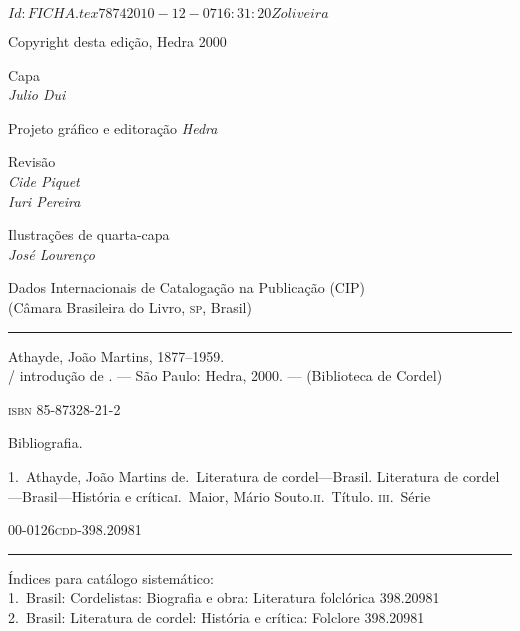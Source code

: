 \SVN $Id: FICHA.tex 7874 2010-12-07 16:31:20Z oliveira $

\pagebreak

\begingroup \fontsize{9pt}{0.7\baselineskip}\selectfont \parskip=0pt\thispagestyle{empty} 

\begin{center}
Copyright\raisebox{-1.2mm}{$^\copyright$}  desta edição, Hedra 2000\\\medskip

Capa\\
\textit{Julio Dui}\\\medskip

Projeto gráfico e editoração
\textit{Hedra}

Revisão\\
\textit{Cide Piquet}\\
\textit{Iuri Pereira}\\\medskip

Ilustrações de quarta-capa\\
\textit{José Lourenço}\\\bigskip

\begin{minipage}{.8\textwidth}
\fontsize{7pt}{5pt}\selectfont
Dados Internacionais de Catalogação na Publicação (CIP)\\
(Câmara Brasileira do Livro, \textsc{sp}, Brasil)\\
\mbox{}\vspace{-0.2ex}\hrule\vspace{1ex}

Athayde, João Martins, 1877--1959.\\
\makeatletter\@autor / introdução de \@introdutor\makeatother.
--- São Paulo: Hedra, 2000. --- (Biblioteca de Cordel)\\\smallskip

\textsc{isbn} 85-87328-21-2\\\smallskip

Bibliografia.

1.~Athayde, João Martins de.~Literatura de
cordel---Brasil. Literatura de
cordel---Brasil---História e crítica\quad \textsc{i}.~Maior,
Mário Souto.\quad \textsc{ii}.~Título.\quad
\textsc{iii}.~Série\\\medskip

00-0126\hfill \textsc{cdd}-398.20981

\vspace{1ex}\hrule\vspace{1ex}
Índices para catálogo sistemático:\\
1.~Brasil: Cordelistas: Biografia e obra: Literatura folclórica 398.20981\\
2.~Brasil: Literatura de cordel: História e crítica: Folclore 398.20981
\end{minipage}
\vfill


\end{center}

